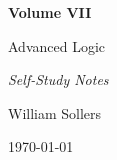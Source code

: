 \begin{titlepage}
\centering

\vspace*{5cm}

{\Huge\bfseries Volume VII\par}

\vspace{0.5cm}

{\LARGE Advanced Logic\par}

\vspace{0.5cm}

{\large\itshape Self-Study Notes\par}

\vfill

{\large William Sollers\par}

\vspace{0.5cm}

{\large \today\par}

\end{titlepage}

